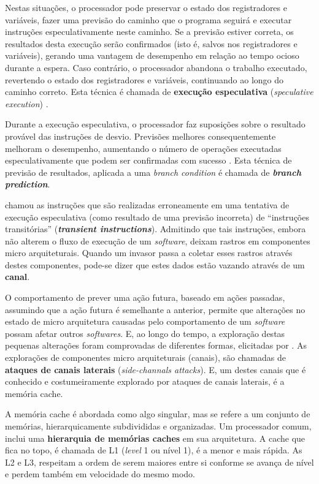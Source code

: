 \documentclass[
	article,			    %
	12pt,				    %
	oneside,			    %
	a4paper,			    %
	chapter=TITLE,		    %
	section=TITLE,		    %
	subsection=TITLE,	    %
	english,			    %
	brazil,				    %
	sumario=tradicional
]{abntex2}
\begin{document}
Nestas situações, o processador pode preservar o estado dos registradores e variáveis, fazer uma previsão do caminho que o programa seguirá e executar instruções especulativamente neste caminho. Se a previsão estiver correta, os resultados desta execução serão confirmados (isto é, salvos nos registradores e variáveis), gerando uma vantagem de desempenho em relação ao tempo ocioso durante a espera. Caso contrário, o processador abandona o trabalho executado, revertendo o estado dos registradores e variáveis, continuando ao longo do caminho correto. Esta técnica é chamada de \textbf{execução especulativa} (\emph{speculative execution}) \cite{Kocher2018Spectre}.

Durante a execução especulativa, o processador faz suposições sobre o resultado provável das instruções de desvio. Previsões melhores consequentemente melhoram o desempenho, aumentando o número de operações executadas especulativamente que podem ser confirmadas com sucesso \cite{Kocher2018Spectre}. Esta técnica de previsão de resultados, aplicada a uma \emph{branch condition} é chamada de \textbf{\emph{branch prediction}}.

 chamou as instruções que são realizadas erroneamente em uma tentativa de execução especulativa (como resultado de uma previsão incorreta) de ``instruções transitórias'' (\textbf{\emph{transient instructions}}). Admitindo que tais instruções, embora não alterem o fluxo de execução de um \emph{software}, deixam rastros em componentes micro arquiteturais. Quando um invasor passa a coletar esses rastros através destes componentes, pode-se dizer que estes dados estão vazando através de um \textbf{canal}.

O comportamento de prever uma ação futura, baseado em ações passadas, assumindo que a ação futura é semelhante a anterior, permite que alterações no estado de micro arquitetura causadas pelo comportamento de um \emph{software} possam afetar outros \emph{softwares}. E, ao longo do tempo, a exploração destas pequenas alterações foram comprovadas de diferentes formas, elicitadas por . As explorações de componentes micro arquiteturais (canais), são chamadas de \textbf{ataques de canais laterais} (\emph{side-channals attacks}). E, um destes canais que é conhecido e costumeiramente explorado por ataques de canais laterais, é a memória cache.

A memória cache é abordada como algo singular, mas se refere a um conjunto de memórias, hierarquicamente subdivididas e organizadas. Um processador comum, inclui uma \textbf{hierarquia de memórias caches} em sua arquitetura. A cache que fica no topo, é chamada de L1 (\emph{level} 1 ou nível 1), é a menor e mais rápida. As L2 e L3, respeitam a ordem de serem maiores entre si conforme se avança de nível e perdem também em velocidade do mesmo modo.
\end{document}
